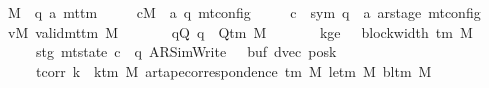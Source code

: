\begin{isabellebody}
\ \ \ M\ {\isacharcolon}{\kern0pt}{\isacharcolon}{\kern0pt}\ {\isachardoublequoteopen}{\isacharparenleft}{\kern0pt}{\isacharprime}{\kern0pt}q{\isacharcomma}{\kern0pt}\ {\isacharprime}{\kern0pt}a{\isacharparenright}{\kern0pt}\ mttm{\isachardoublequoteclose}\isanewline
\ \ \ \ \ cM\ {\isacharcolon}{\kern0pt}{\isacharcolon}{\kern0pt}\ {\isachardoublequoteopen}{\isacharparenleft}{\kern0pt}{\isacharprime}{\kern0pt}a{\isacharcomma}{\kern0pt}\ {\isacharprime}{\kern0pt}q{\isacharparenright}{\kern0pt}\ mt{\isacharunderscore}{\kern0pt}config{\isachardoublequoteclose}\isanewline
\ \ \ \ \ c{}\ {\isacharcolon}{\kern0pt}{\isacharcolon}{\kern0pt}\ {\isachardoublequoteopen}{\isacharparenleft}{\kern0pt}sym{}{\isacharcomma}{\kern0pt}\ {\isacharprime}{\kern0pt}q\ {\isasymtimes}\ {\isacharprime}{\kern0pt}a\ ar{\isacharunderscore}{\kern0pt}stage{\isacharparenright}{\kern0pt}\ mt{\isacharunderscore}{\kern0pt}config{\isachardoublequoteclose}\isanewline
\ \ \ vM{\isacharcolon}{\kern0pt}\ {\isachardoublequoteopen}valid{\isacharunderscore}{\kern0pt}mttm\ M{\isachardoublequoteclose}\isanewline
\ \ \ \ \ \ \ qQ{\isacharcolon}{\kern0pt}\ {\isachardoublequoteopen}q\ {\isasymin}\ Q{\isacharunderscore}{\kern0pt}tm\ M{\isachardoublequoteclose}\isanewline
\ \ \ \ \ \ \ kge{}{\isacharcolon}{\kern0pt}\ {\isachardoublequoteopen}{}\ {\isasymle}\ block{\isacharunderscore}{\kern0pt}width\ {\isacharparenleft}{\kern0pt}{\isasymGamma}{\isacharunderscore}{\kern0pt}tm\ M{\isacharparenright}{\kern0pt}{\isachardoublequoteclose}\isanewline
\ \ \ \ \ \ \ stg{}{\isacharcolon}{\kern0pt}\ {\isachardoublequoteopen}mt{\isacharunderscore}{\kern0pt}state\ c{}\ {\isacharequal}{\kern0pt}\ {\isacharparenleft}{\kern0pt}q{\isacharcomma}{\kern0pt}\ AR{\isacharunderscore}{\kern0pt}SimWrite{\isacharcomma}{\kern0pt}\ {}{\isacharcomma}{\kern0pt}\ {}{\isacharcomma}{\kern0pt}\ buf{\isacharcomma}{\kern0pt}\ dvec{\isacharcomma}{\kern0pt}\ posk{\isacharparenright}{\kern0pt}{\isachardoublequoteclose}\isanewline
\ \ \ \ \ \ \ tcorr{\isacharcolon}{\kern0pt}\ {\isachardoublequoteopen}{\isasymforall}k\ {\isacharless}{\kern0pt}\ k{\isacharunderscore}{\kern0pt}tm\ M{\isachardot}{\kern0pt}\ ar{\isacharunderscore}{\kern0pt}tape{\isacharunderscore}{\kern0pt}correspondence\ {\isacharparenleft}{\kern0pt}{\isasymGamma}{\isacharunderscore}{\kern0pt}tm\ M{\isacharparenright}{\kern0pt}\ {\isacharparenleft}{\kern0pt}le{\isacharunderscore}{\kern0pt}tm\ M{\isacharparenright}{\kern0pt}\ {\isacharparenleft}{\kern0pt}bl{\isacharunderscore}{\kern0pt}tm\ M{\isacharparenright}{\kern0pt}\isanewline

\end{isabellebody}
